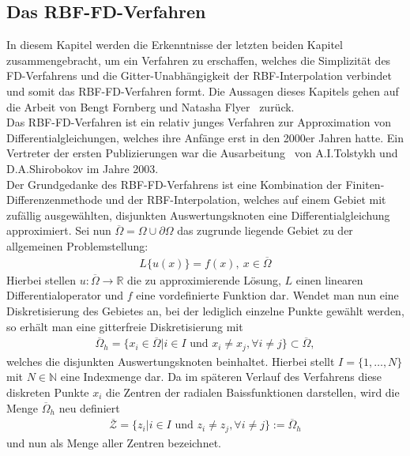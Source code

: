 \documentclass[12pt,titlepage]{article}
\begin{document}
\subsection{Das RBF-FD-Verfahren}
In diesem Kapitel werden die Erkenntnisse der letzten beiden Kapitel zusammengebracht, um ein Verfahren zu erschaffen, welches die Simplizität des FD-Verfahrens und die Gitter-Unabhängigkeit der RBF-Interpolation verbindet und somit das RBF-FD-Verfahren formt. Die Aussagen dieses Kapitels gehen auf die Arbeit von Bengt Fornberg und Natasha Flyer~\cite{fornberg2015primer} zurück.\\
Das RBF-FD-Verfahren ist ein relativ junges Verfahren zur Approximation von Differentialgleichungen, welches ihre Anfänge erst in den 2000er Jahren hatte. Ein Vertreter der ersten Publizierungen war die Ausarbeitung~\cite{tolstykh2003using} von  A.I.Tolstykh und D.A.Shirobokov im Jahre 2003.\\
Der Grundgedanke des RBF-FD-Verfahrens ist eine Kombination der Finiten-Differenzenmethode und der RBF-Interpolation, welches auf einem Gebiet mit zufällig ausgewählten, disjunkten Auswertungsknoten eine Differentialgleichung approximiert. Sei nun $\overline{\Omega}=\Omega\cup\partial\Omega$ das zugrunde liegende Gebiet zu der allgemeinen Problemstellung:
\begin{align}
 L\{u(x)\}=f(x),~x\in\overline{\Omega}\label{eq:FD-allgemein}
\end{align}
Hierbei stellen $u:\overline{\Omega}\rightarrow\mathbb{R}$ die zu approximierende Lösung, $L$ einen linearen Differentialoperator und $f$ eine vordefinierte Funktion dar. Wendet man nun eine Diskretisierung des Gebietes an, bei der lediglich einzelne Punkte gewählt werden, so erhält man eine gitterfreie Diskretisierung mit 
\begin{align*}
 \overline{\Omega}_h=\{x_i\in\overline{\Omega}|i\in I\text{ und }x_i\neq x_j,\forall i\neq j\}\subset\overline{\Omega},
\end{align*}
welches die disjunkten Auswertungsknoten beinhaltet. Hierbei stellt $I=\{1,\dots,N\}$ mit $N\in\mathbb{N}$ eine Indexmenge dar. Da im späteren Verlauf des Verfahrens diese diskreten Punkte $x_i$ die Zentren der radialen Baissfunktionen darstellen, wird die Menge $\overline{\Omega}_h$ neu definiert
\begin{align*}
 \overline{\mathcal{Z}}=\{z_i|i\in I\text{ und }z_i\neq z_j,\forall i\neq j\}:=\overline{\Omega}_h
\end{align*}
und nun als Menge aller Zentren bezeichnet.\\
\end{document}
